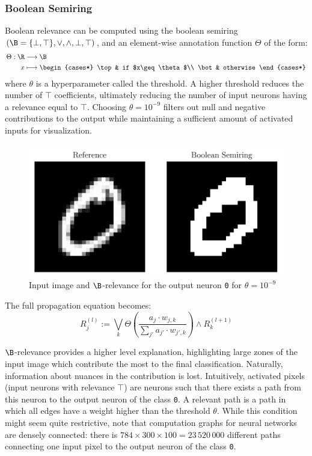 \documentclass{../cs-classes/cs-classes}
\newcommand*{\1}{\digitsbb{1}}
\newcommand*{\0}{\digitsbb{0}}
\begin{document}
\subsubsection{Boolean Semiring}
Boolean relevance can be computed using the boolean semiring $(\B=\{\bot, \top\}, \lor, \land, \bot, \top)$, and an element-wise annotation function $\Theta$ of the form:
\begin{equation}
    \begin{aligned}
        \Theta: \R&\longrightarrow \B\\
        x&\longmapsto \begin{cases*}
            \top & if $x\geq\theta$\\
            \bot & otherwise
        \end{cases*}
    \end{aligned}
\end{equation}
where $\theta$ is a hyperparameter called the threshold. A higher threshold reduces the number of $\top$ coefficients, ultimately reducing the number of input neurons having a relevance equal to $\top$. Choosing $\theta=10^{-9}$ filters out null and negative contributions to the output while maintaining a sufficient amount of activated inputs for visualization.

\begin{figure}[H]
    \centering
    \includegraphics[width=.5\textwidth]{boolean.png}
    \caption{Input image and $\B$-relevance for the output neuron \texttt{0} for $\theta=10^{-9}$}
\end{figure}

The full propagation equation becomes:
\begin{equation}
    R^{(l)}_j := \bigvee_{k}\Theta\left(\frac{a_j\cdot w_{j, k}}{\sum_{j'}a_{j'}\cdot w_{j', k}}\right) \land R^{(l+1)}_k
    \label{eq:boolean-lrp}
\end{equation}

$\B$-relevance provides a higher level explanation, highlighting large zones of the input image which contribute the most to the final classification.
Naturally, information about nuances in the contribution is lost. Intuitively, activated pixels (input neurons with relevance $\top$) are neurons such that there exists a  path from this neuron to the output neuron of the class \texttt{0}. A relevant path is a path in which all edges have a weight higher than the threshold $\theta$. While this condition might seem quite restrictive, note that computation graphs for neural networks are densely connected: there is $784\times300\times100=23\,520\,000$ different paths connecting one input pixel to the output neuron of the class \texttt{0}.
\end{document}
